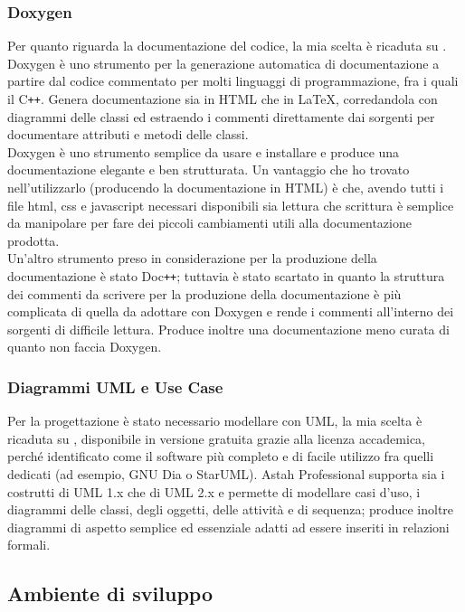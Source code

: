         \subsubsection{Doxygen}
        Per quanto riguarda la documentazione del codice, la mia scelta è ricaduta su . Doxygen è uno strumento per la generazione automatica di documentazione a partire dal codice commentato per molti linguaggi di programmazione, fra i quali il C\texttt{++}. Genera documentazione sia in HTML che in \LaTeX, corredandola con diagrammi delle classi ed estraendo i commenti direttamente dai sorgenti per documentare attributi e metodi delle classi.\\ Doxygen è uno strumento semplice da usare e installare e produce una documentazione elegante e ben strutturata. Un vantaggio che ho trovato nell'utilizzarlo (producendo la documentazione in HTML) è che, avendo tutti i file html, css e javascript necessari disponibili sia lettura che scrittura è semplice da manipolare per fare dei piccoli cambiamenti utili alla documentazione prodotta. \\
        Un'altro strumento preso in considerazione per la produzione della documentazione è stato Doc\texttt{++}; tuttavia è stato scartato in quanto la struttura dei commenti da scrivere per la produzione della documentazione è più complicata di quella da adottare con Doxygen e rende i commenti all'interno dei sorgenti di difficile lettura. Produce inoltre una documentazione meno curata di quanto non faccia Doxygen.
        \subsubsection{Diagrammi UML e Use Case}
        Per la progettazione è stato necessario modellare con UML, la mia scelta è ricaduta su , disponibile in versione gratuita grazie alla licenza accademica, perché identificato come il software più completo e di facile utilizzo fra quelli dedicati (ad esempio, GNU Dia o StarUML). Astah Professional supporta sia i costrutti di UML 1.x che di UML 2.x e permette di modellare casi d'uso, i diagrammi delle classi, degli oggetti, delle attività e di sequenza; produce inoltre diagrammi di aspetto semplice ed essenziale adatti ad essere inseriti in relazioni formali.

    \subsection{Ambiente di sviluppo}

